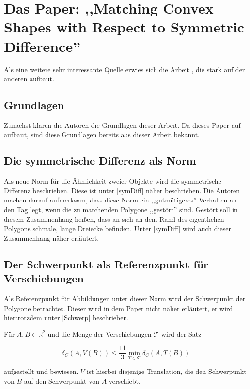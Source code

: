 \section[Matching Shapes with Symmetric Difference]{Das Paper: ,,Matching Convex Shapes with Respect to Symmetric Difference'' }\label{AFRWW}

Als eine weitere sehr interessante Quelle erwies sich die Arbeit \cite{AFRW}, die stark auf der anderen aufbaut. 

\subsection{Grundlagen}

Zunächst klären die Autoren die Grundlagen dieser Arbeit. Da dieses Paper auf \cite{AAR} aufbaut, sind diese Grundlagen bereits aus dieser Arbeit bekannt. 

\subsection{Die symmetrische Differenz als Norm}

Als neue Norm für die Ähnlichkeit zweier Objekte wird die symmetrische Differenz beschrieben. Diese ist unter  \ref{symDiff} näher beschrieben. Die Autoren machen darauf aufmerksam, dass diese Norm ein ,,gutmütigeres'' Verhalten an den Tag legt, wenn die zu matchenden Polygone ,,gestört'' sind. Gestört soll in diesem Zusammenhang heißen, dass an sich an dem Rand des eigentlichen Polygons schmale, lange Dreiecke befinden. Unter \ref{symDiff} wird auch dieser Zusammenhang näher erläutert.

\subsection{Der Schwerpunkt als Referenzpunkt für Verschiebungen}

Als Referenzpunkt für Abbildungen unter dieser Norm wird der Schwerpunkt der Polygone betrachtet. Dieser wird in dem Paper  nicht näher erläutert, er wird hiertrotzdem unter \ref{Schwerp} beschrieben. 

Für $A, B \in \mathbb{R}^2$ und  die Menge der Verschiebungen $\mathcal{T}$ wird der Satz

$$\delta_C (A,V(B))\leq\frac{11}{3}\min_{T\in\mathcal{T}}\delta_C(A,T(B))$$


aufgestellt und bewiesen. $V$ ist hierbei diejenige Translation, die den Schwerpunkt von $B$ auf den Schwerpunkt von $A$ verschiebt.

